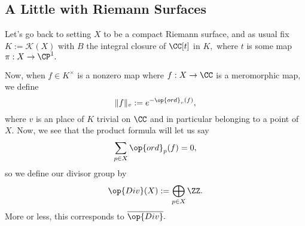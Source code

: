 \subsection{A Little with Riemann Surfaces}
Let's go back to setting $X$ to be a compact Riemann surface, and as usual fix $K:=\mathcal K(X)$ with $B$ the integral closure of $\CC[t]$ in $K,$ where $t$ is some map $\pi:X\to\CP^1.$

Now, when $f\in K^\times$ is a nonzero map where $f:X\to\CC$ is a meromorphic map, we define
\[\lVert f\rVert_v:=e^{-\op{ord}_v(f)},\]
where $v$ is an place of $K$ trivial on $\CC$ and in particular belonging to a point of $X.$ Now, we see that the product formula will let us say
\[\sum_{p\in X}\op{ord}_p(f)=0,\]
so we define our divisor group by
\[\op{Div}(X):=\bigoplus_{p\in X}\ZZ.\]
More or less, this corresponds to $\overline{\op{Div}}.$